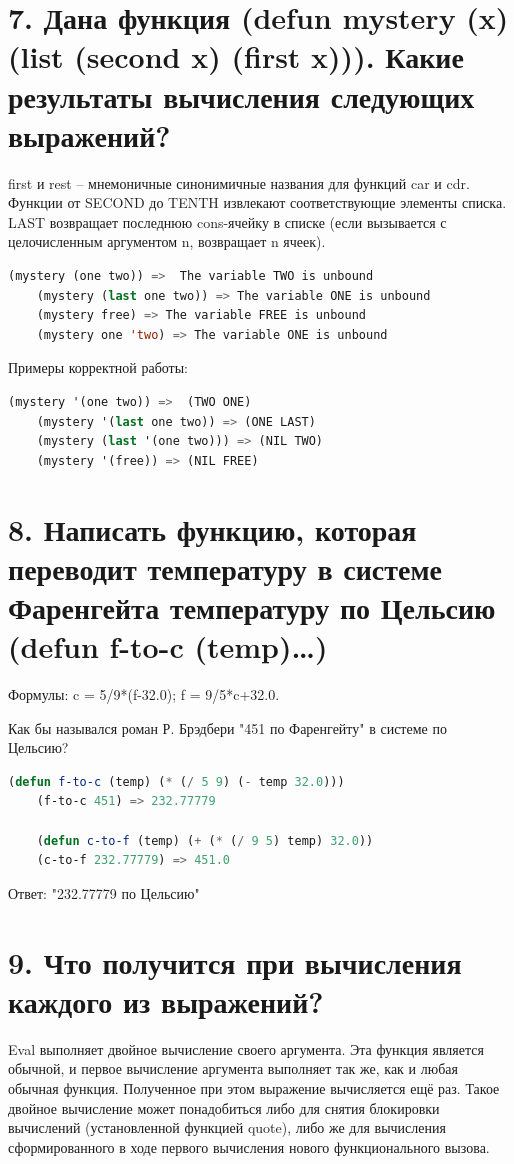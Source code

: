 \documentclass[12pt]{report}
\begin{document}
\section*{7. Дана функция (defun mystery (x) (list (second x) (first x))). Какие результаты вычисления следующих выражений?}

first и rest -- мнемоничные синонимичные названия для функций car и cdr. Функции от SECOND до TENTH извлекают соответствующие элементы списка. LAST	возвращает последнюю cons-ячейку в списке (если вызывается с целочисленным аргументом n, возвращает n ячеек).

\begin{lstlisting}[language=Lisp]
	(mystery (one two)) =>  The variable TWO is unbound 
	(mystery (last one two)) => The variable ONE is unbound
	(mystery free) => The variable FREE is unbound
	(mystery one 'two) => The variable ONE is unbound
\end{lstlisting}

Примеры корректной работы:
\begin{lstlisting}[language=Lisp]
	(mystery '(one two)) =>  (TWO ONE)
	(mystery '(last one two)) => (ONE LAST)
	(mystery (last '(one two))) => (NIL TWO)
	(mystery '(free)) => (NIL FREE)
\end{lstlisting}

\section*{8. Написать функцию, которая переводит температуру в системе Фаренгейта температуру по Цельсию (defun f-to-c (temp)…)}

Формулы: c = 5/9*(f-32.0); f = 9/5*c+32.0. 

Как бы назывался роман Р. Брэдбери "451 по Фаренгейту" в системе по Цельсию?

\begin{lstlisting}[language=Lisp]
	(defun f-to-c (temp) (* (/ 5 9) (- temp 32.0)))
	(f-to-c 451) => 232.77779
	
	(defun c-to-f (temp) (+ (* (/ 9 5) temp) 32.0))
	(c-to-f 232.77779) => 451.0
\end{lstlisting}

Ответ: "232.77779 по Цельсию"

\section*{9. Что получится при вычисления каждого из выражений?}

Eval выполняет двойное  вычисление своего аргумента. Эта функция является обычной, и первое  вычисление аргумента выполняет так же, как и любая обычная функция.  Полученное при этом выражение вычисляется ещё раз. Такое двойное  вычисление может понадобиться либо для снятия блокировки вычислений (установленной функцией quote), либо же для вычисления сформированного в ходе первого вычисления нового функционального вызова.
 
\end{document}
